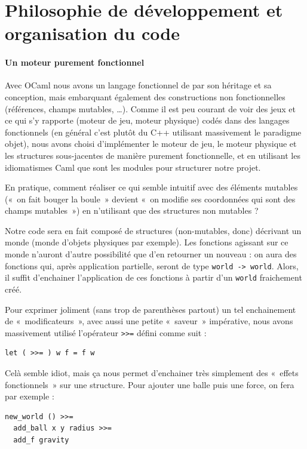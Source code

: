 \documentclass[a4paper]{scrartcl}
\begin{document}

\section{Philosophie de développement et organisation du code}
\paragraph{Un moteur purement fonctionnel}

Avec OCaml nous avons un langage fonctionnel de par son héritage et sa
conception, mais embarquant également des constructions non
fonctionnelles (références, champs mutables, …). Comme il est peu
courant de voir des jeux et ce qui s'y rapporte (moteur de jeu, moteur
physique) codés dans des langages fonctionnels (en général c'est
plutôt du C++ utilisant massivement le paradigme objet), nous avons
choisi d'implémenter le moteur de jeu, le moteur physique et les
structures sous-jacentes de manière purement fonctionnelle, et en
utilisant les idiomatismes Caml que sont les modules pour structurer
notre projet.

En pratique, comment réaliser ce qui semble intuitif avec des éléments
mutables («~on fait bouger la boule~» devient «~on modifie ses
coordonnées qui sont des champs mutables~») en n'utilisant que des
structures non mutables ?

Notre code sera en fait composé de structures (non-mutables, donc)
décrivant un monde (monde d'objets physiques par exemple). Les
fonctions agissant sur ce monde n'auront d'autre possibilité que d'en
retourner un nouveau : on aura des fonctions qui, après application
partielle, seront de type \texttt{world -> world}. Alors, il suffit
d'enchainer l'application de ces fonctions à partir d'un
\texttt{world} fraichement créé.

Pour exprimer joliment (sans trop de parenthèses partout) un tel
enchainement de «~modificateurs~», avec aussi une petite «~saveur~»
impérative, nous avons massivement utilisé l'opérateur \texttt{>>=}
défini comme suit :
\begin{verbatim}
let ( >>= ) w f = f w
\end{verbatim}

Celà semble idiot, mais ça nous permet d'enchainer très simplement des
«~effets fonctionnels~» sur une structure. Pour ajouter une balle puis
une force, on fera par exemple :
\begin{verbatim}
new_world () >>=
  add_ball x y radius >>=
  add_f gravity
\end{verbatim}
\end{document}
